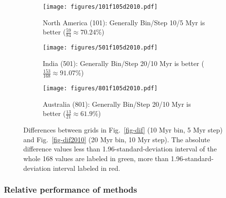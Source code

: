 \begin{figure*}
	\centering
	\begin{subfigure}{1\textwidth}
		\texttt{[image: figures/101f105d2010.pdf]}
		\caption{North America (101): Generally Bin/Step 10/5 Myr is better
		($\frac{59}{84}\approx70.24\%$)}\label{fig-101f105d2010}
	\end{subfigure}
	\vspace{.1em}
	\begin{subfigure}{1\textwidth}
		\texttt{[image: figures/501f105d2010.pdf]}
		\caption{India (501): Generally Bin/Step 20/10 Myr is better
		($\frac{153}{168}\approx91.07\%$)}\label{fig-501f105d2010}
	\end{subfigure}
	\vspace{.1em}
	\begin{subfigure}{1\textwidth}
		\texttt{[image: figures/801f105d2010.pdf]}
		\caption{Australia (801): Generally Bin/Step 20/10 Myr is better
		($\frac{13}{21}\approx61.9\%$)}\label{fig-801f105d2010}
	\end{subfigure}
	\caption[]{Differences between grids in Fig.~\ref{fig-dif} (10 Myr bin, 5
Myr step) and Fig.~\ref{fig-dif2010} (20 Myr bin, 10 Myr step). The absolute
difference values less than 1.96-standard-deviation interval of the whole 168
values are labeled in green, more than 1.96-standard-deviation interval labeled
in red.}\label{fig-f105d2010}
\end{figure*}

\subsubsection{Relative performance of methods}

